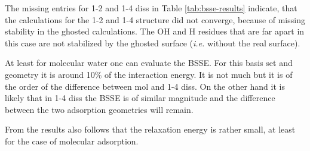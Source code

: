 \documentclass[11pt,DIV=13,BCOR=5mm,a4paper,headinclude]{scrbook}
\begin{document}
The missing entries for 1-2 and 1-4 diss in Table \ref{tab:bsse-results} indicate, that the calculations for the 1-2 and 1-4 structure did not converge, because of missing stability in the ghosted calculations.
The OH and H residues that are far apart in this case are not stabilized by the ghosted surface (\textit{i.e.} without the real surface).


At least for molecular water one can evaluate the BSSE.
For this basis set and geometry it is around 10$\%$ of the interaction
energy.
It is not much but it is of the order of the difference between mol and 1-4 diss.
On the other hand it is likely that in 1-4 diss the BSSE is of similar magnitude and the difference between the two adsorption geometries will remain.


From the results also follows that the relaxation energy is rather small, at least for the case of molecular adsorption. %
\end{document}
